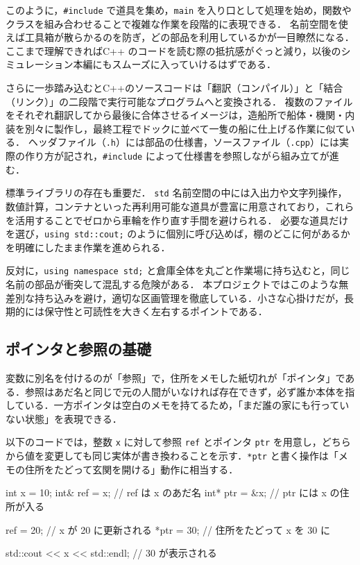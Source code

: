 \documentclass[10pt,letterpaper]{jsarticle}
\begin{document}
このように，\verb|#include| で道具を集め，\verb|main| を入り口として処理を始め，関数やクラスを組み合わせることで複雑な作業を段階的に表現できる．
名前空間を使えば工具箱が散らかるのを防ぎ，どの部品を利用しているかが一目瞭然になる．
ここまで理解できればC++ のコードを読む際の抵抗感がぐっと減り，以後のシミュレーション本編にもスムーズに入っていけるはずである．

さらに一歩踏み込むとC++のソースコードは「翻訳（コンパイル）」と「結合（リンク）」の二段階で実行可能なプログラムへと変換される．
複数のファイルをそれぞれ翻訳してから最後に合体させるイメージは，造船所で船体・機関・内装を別々に製作し，最終工程でドックに並べて一隻の船に仕上げる作業に似ている．
ヘッダファイル（\verb|.h|）には部品の仕様書，ソースファイル（\verb|.cpp|）には実際の作り方が記され，\verb|#include| によって仕様書を参照しながら組み立てが進む．

標準ライブラリの存在も重要だ．
\verb|std| 名前空間の中には入出力や文字列操作，数値計算，コンテナといった再利用可能な道具が豊富に用意されており，これらを活用することでゼロから車輪を作り直す手間を避けられる．
必要な道具だけを選び，\verb|using std::cout;| のように個別に呼び込めば，棚のどこに何があるかを明確にしたまま作業を進められる．

反対に，\verb|using namespace std;| と倉庫全体を丸ごと作業場に持ち込むと，同じ名前の部品が衝突して混乱する危険がある．
本プロジェクトではこのような無差別な持ち込みを避け，適切な区画管理を徹底している．小さな心掛けだが，長期的には保守性と可読性を大きく左右するポイントである．

\subsection{ポインタと参照の基礎}
変数に別名を付けるのが「参照」で，住所をメモした紙切れが「ポインタ」である．参照はあだ名と同じで元の人間がいなければ存在できず，必ず誰か本体を指している．一方ポインタは空白のメモを持てるため，「まだ誰の家にも行っていない状態」を表現できる．

以下のコードでは，整数 \verb|x| に対して参照 \verb|ref| とポインタ \verb|ptr| を用意し，どちらから値を変更しても同じ実体が書き換わることを示す．\verb|*ptr| と書く操作は「メモの住所をたどって玄関を開ける」動作に相当する．

\begin{cppcode}[caption=参照とポインタの基本]
int x = 10;
int& ref = x;   // ref は x のあだ名
int* ptr = &x;  // ptr には x の住所が入る

ref = 20;       // x が 20 に更新される
*ptr = 30;      // 住所をたどって x を 30 に

std::cout << x << std::endl; // 30 が表示される
\end{cppcode}
\end{document}
